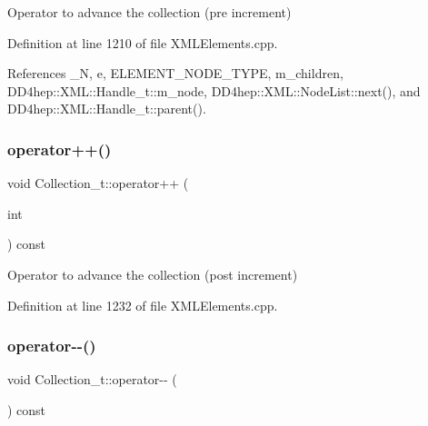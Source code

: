 Operator to advance the collection (pre increment) 



Definition at line 1210 of file X\+M\+L\+Elements.\+cpp.



References \+\_\+N, e, E\+L\+E\+M\+E\+N\+T\+\_\+\+N\+O\+D\+E\+\_\+\+T\+Y\+PE, m\+\_\+children, D\+D4hep\+::\+X\+M\+L\+::\+Handle\+\_\+t\+::m\+\_\+node, D\+D4hep\+::\+X\+M\+L\+::\+Node\+List\+::next(), and D\+D4hep\+::\+X\+M\+L\+::\+Handle\+\_\+t\+::parent().

\hypertarget{class_d_d4hep_1_1_x_m_l_1_1_collection__t_a6eff27d291d88d0e36f8aef829b3acc1}{}\label{class_d_d4hep_1_1_x_m_l_1_1_collection__t_a6eff27d291d88d0e36f8aef829b3acc1} 
\subsubsection{\texorpdfstring{operator++()}{operator++()}\hspace{0.1cm}{\footnotesize\ttfamily [2/2]}}
{\footnotesize\ttfamily void Collection\+\_\+t\+::operator++ (\begin{DoxyParamCaption}\item[{int}]{ }\end{DoxyParamCaption}) const}



Operator to advance the collection (post increment) 



Definition at line 1232 of file X\+M\+L\+Elements.\+cpp.

\hypertarget{class_d_d4hep_1_1_x_m_l_1_1_collection__t_a91fb9a280c6e17c0f1327f2d96a6fa4f}{}\label{class_d_d4hep_1_1_x_m_l_1_1_collection__t_a91fb9a280c6e17c0f1327f2d96a6fa4f} 
\subsubsection{\texorpdfstring{operator-\/-\/()}{operator--()}\hspace{0.1cm}{\footnotesize\ttfamily [1/2]}}
{\footnotesize\ttfamily void Collection\+\_\+t\+::operator-\/-\/ (\begin{DoxyParamCaption}{ }\end{DoxyParamCaption}) const}



